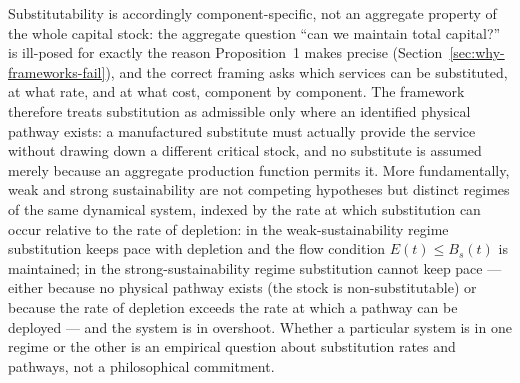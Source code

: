 \documentclass[twocolumn,10pt]{article}
\begin{document}
Substitutability is accordingly component-specific, not an aggregate property of the whole capital stock: the aggregate question ``can we maintain total capital?'' is ill-posed for exactly the reason Proposition~1 makes precise (Section~\ref{sec:why-frameworks-fail}), and the correct framing asks which services can be substituted, at what rate, and at what cost, component by component. The framework therefore treats substitution as admissible only where an identified physical pathway exists: a manufactured substitute must actually provide the service without drawing down a different critical stock, and no substitute is assumed merely because an aggregate production function permits it. More fundamentally, weak and strong sustainability are not competing hypotheses but distinct regimes of the same dynamical system, indexed by the rate at which substitution can occur relative to the rate of depletion: in the weak-sustainability regime substitution keeps pace with depletion and the flow condition \(E(t)\le B_s(t)\) is maintained; in the strong-sustainability regime substitution cannot keep pace --- either because no physical pathway exists (the stock is non-substitutable) or because the rate of depletion exceeds the rate at which a pathway can be deployed --- and the system is in overshoot. Whether a particular system is in one regime or the other is an empirical question about substitution rates and pathways, not a philosophical commitment.
\end{document}
